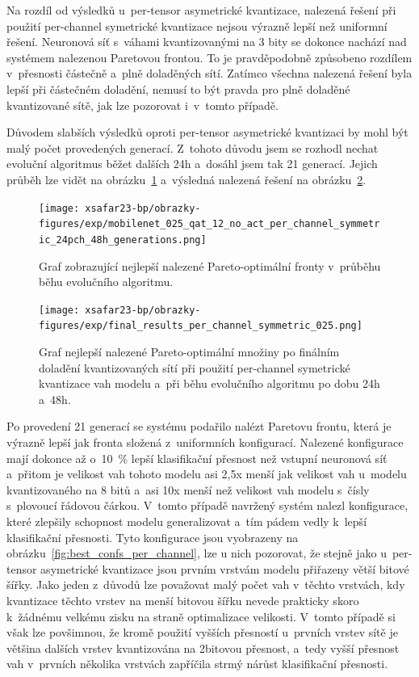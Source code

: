 Na rozdíl od výsledků u~per-tensor asymetrické kvantizace, nalezená řešení při použití per-channel symetrické kvantizace nejsou výrazně lepší než uniformní řešení. Neuronová síť s~váhami kvantizovanými na 3 bity se dokonce nachází nad systémem nalezenou Paretovou frontou. To je pravděpodobně způsobeno rozdílem v~přesnosti částečně a~plně doladěných sítí. Zatímco všechna nalezená řešení byla lepší při částečném doladění, nemusí to být pravda pro plně doladěné kvantizované sítě, jak lze pozorovat i~v~tomto případě.

Důvodem slabších výsledků oproti per-tensor asymetrické kvantizaci by mohl být malý počet provedených generací. Z~tohoto důvodu jsem se rozhodl nechat evoluční algoritmus běžet dalších 24h a~dosáhl jsem tak 21 generací. Jejich průběh lze vidět na obrázku~\ref{fig:per_channel_symmetric_48h_generations} a~výsledná nalezená řešení na obrázku~\ref{fig:per_channel_symmetric_48h}.

\begin{figure}[H]
	\centering
	\texttt{[image: xsafar23-bp/obrazky-figures/exp/mobilenet\_025\_qat\_12\_no\_act\_per\_channel\_symmetric\_24pch\_48h\_generations.png]}
	\caption{Graf zobrazující nejlepší nalezené Pareto-optimální fronty v~průběhu běhu evolučního algoritmu.}
	\label{fig:per_channel_symmetric_48h_generations}
\end{figure}

\begin{figure}[H]
	\centering
	\texttt{[image: xsafar23-bp/obrazky-figures/exp/final\_results\_per\_channel\_symmetric\_025.png]}
	\caption{Graf nejlepší nalezené Pareto-optimální množiny po finálním doladění kvantizovaných sítí při použití per-channel symetrické kvantizace vah modelu a~při běhu evolučního algoritmu po dobu 24h a~48h.}
	\label{fig:per_channel_symmetric_48h}
\end{figure}

Po provedení 21 generací se systému podařilo nalézt Paretovu frontu, která je výrazně lepší jak fronta složená z~uniformních konfigurací. Nalezené konfigurace mají dokonce až o~10~\% lepší klasifikační přesnost než vstupní neuronová síť a~přitom je velikost vah tohoto modelu asi 2,5x menší jak velikost vah u~modelu kvantizovaného na 8 bitů a~asi 10x menší než velikost vah modelu s~čísly s~plovoucí řádovou čárkou. V~tomto případě navržený systém nalezl konfigurace, které zlepšily schopnost modelu generalizovat a~tím pádem vedly k~lepší klasifikační přesnosti. Tyto konfigurace jsou vyobrazeny na obrázku~\ref{fig:best_confs_per_channel}, lze u nich pozorovat, že stejně jako u~per-tensor asymetrické kvantizace jsou prvním vrstvám modelu přiřazeny větší bitové šířky. Jako jeden z~důvodů lze považovat malý počet vah v~těchto vrstvách, kdy kvantizace těchto vrstev na menší bitovou šířku nevede prakticky skoro k~žádnému velkému zisku na straně optimalizace velikosti. V~tomto případě si však lze povšimnou, že kromě použití vyšších přesností u~prvních vrstev sítě je většina dalších vrstev kvantizována na 2bitovou přesnost, a~tedy vyšší přesnost vah v~prvních několika vrstvách zapříčila strmý nárůst klasifikační přesnosti.

